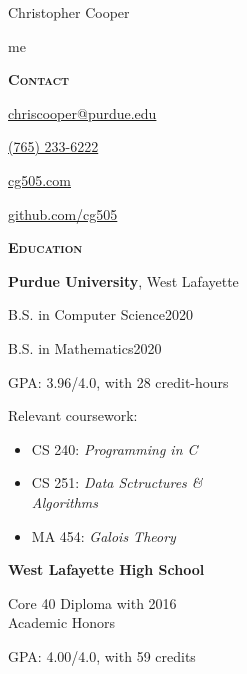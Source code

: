 \documentclass[11pt]{article}
\newcommand{\sectionfont}{\Large\scshape\bfseries\color{cg505green}}
\begin{document}
\begin{centering}
  \fontsize{40pt}{50pt}\selectfont
  \color{cg505green}
  Christopher Cooper

\end{centering}

\vspace{10pt}

\begin{minipage}[t]{0.3\textwidth}
  {\Huge\color{black} me \phantom{my work}}

  \vspace{5pt}

  {\sectionfont Contact}
  \begin{adjustwidth}{10pt}{}
    \href{mailto:chriscooper@purdue.edu}{chriscooper@purdue.edu}

    \href{tel:+17652336222}{(765) 233-6222}

    \href{https://cg505.com/}{cg505.com}

    \href{https://github.com/cg505/}{github.com/cg505}
  \end{adjustwidth}

  \vspace{5pt}

  {\sectionfont Education}

  \textbf{Purdue University}, West Lafayette
  \begin{adjustwidth}{10pt}{}
    B.S. in Computer Science\hfill2020

    B.S. in Mathematics\hfill2020

    GPA: 3.96/4.0, with 28 credit-hours

    Relevant coursework:
    \begin{itemize}[leftmargin=*]
    \item CS 240: \emph{Programming in C}
    \item CS 251: \emph{Data Sctructures \&}\\\phantom{CS 251:} \emph{Algorithms}
    \item MA 454: \emph{Galois Theory}
    \end{itemize}
  \end{adjustwidth}

  \textbf{West Lafayette High School}
  \begin{adjustwidth}{10pt}{}
    Core 40 Diploma with \hfill2016\\
    Academic Honors

    GPA: 4.00/4.0, with 59 credits
  \end{adjustwidth}


\end{minipage}
\end{document}
